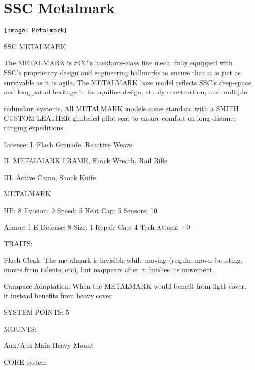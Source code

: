 
\section{SSC Metalmark}

\centering\texttt{[image: Metalmark]}

                                             SSC METALMARK

The METALMARK is SCC’s backbone-class line mech, fully equipped with SSC’s proprietary design and
engineering hallmarks to ensure that it is just as survivable as it is agile. The METALMARK base model
reflects SSC’s deep-space and long patrol heritage in its aquiline design, sturdy construction, and multiple

redundant systems. All METALMARK models come standard with a SMITH CUSTOM LEATHER gimbaled
pilot seat to ensure comfort on long distance ranging expeditions.




                                                     License:
 I. Flash Grenade, Reactive Weave

 II. METALMARK FRAME, Shock Wreath, Rail Rifle

 III. Active Camo, Shock Knife


                                                METALMARK

  HP: 8          Evasion: 9                             Speed: 5            Heat Cap: 5         Sensors: 10

 Armor: 1        E-Defense: 8                           Size: 1             Repair Cap: 4       Tech Attack:
                                                                                                +0

                                                     TRAITS:

  Flash Cloak: The metalmark is invisible while moving (regular move, boosting, moves from talents, etc),
  but reappears after it finishes its movement.

  Carapace Adaptation: When the METALMARK would benefit from light cover, it instead benefits from
  heavy cover

                                              SYSTEM POINTS: 5

                                                    MOUNTS:

 Aux/Aux                             Main                                   Heavy Mount

                                                 CORE system

